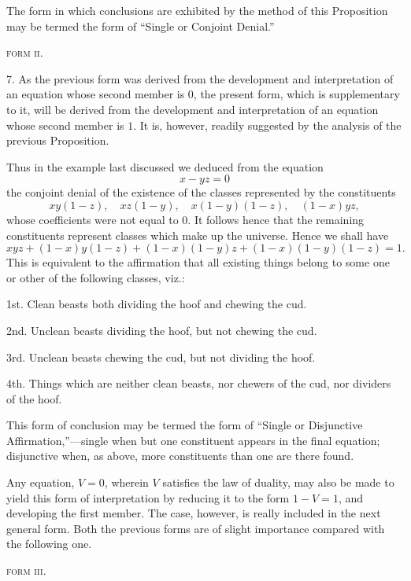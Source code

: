 \documentclass[oneside]{book}
\begin{document}
The form in which conclusions are exhibited by the method
of this Proposition may be termed the form of ``Single or Conjoint
Denial.''

\begin{center}
\textsc{form ii}.
\end{center}

7. As the previous form was derived from the development
and interpretation of an equation whose second member is $0$, the
present form, which is supplementary to it, will be derived from
the development and interpretation of an equation whose second
member is $1$. It is, however, readily suggested by the analysis
of the previous Proposition.

Thus in the example last discussed we deduced from the
equation
\[
x - yz = 0
\]
the conjoint denial of the existence of the classes represented by
the constituents
\[
xy\left(1-z\right),\quad  xz\left(1-y\right), \quad x\left(1-y\right)\left(1-z\right), \quad \left(1-x\right)yz,
\]
whose coefficients were not equal to 0. It follows hence that
the remaining constituents represent classes which make up the
universe. Hence we shall have
\[
xyz+\left(1-x\right)y\left(1-z\right)+\left(1-x\right)\left(1-y\right)z+\left(1-x\right)\left(1-y\right)\left(1-z\right)=1.
\]
This is equivalent to the affirmation that all existing things belong
to some one or other of the following classes, viz.:

1st. Clean beasts both dividing the hoof and chewing the
cud.

2nd. Unclean beasts dividing the hoof, but not chewing the
cud.

3rd. Unclean beasts chewing the cud, but not dividing the
hoof.

4th. Things which are neither clean beasts, nor chewers of
the cud, nor dividers of the hoof.

This form of conclusion may be termed the form of ``Single
or Disjunctive Affirmation,''---single when but one constituent
appears in the final equation; disjunctive when, as above, more
constituents than one are there found.

Any equation, $V=0$, wherein $V$ satisfies the law of duality,
may also be made to yield this form of interpretation by reducing
it to the form $1-V=1$, and developing the first member. The
case, however, is really included in the next general form. Both
the previous forms are of slight importance compared with the
following one.

\begin{center}
\textsc{form iii}.
\end{center}
\end{document}
